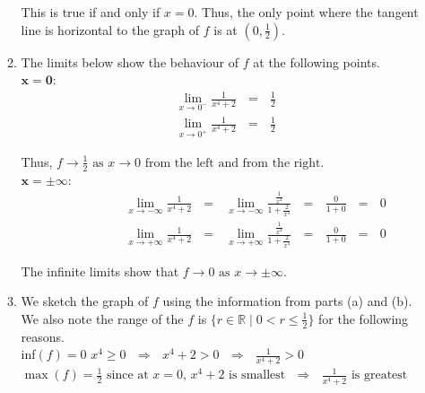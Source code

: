 \documentclass[12pt]{amsart}
\begin{document}
\begin{enumerate}
\begin{enumerate}
			\bigskip
			This is true if and only if $x=0$.  Thus, the only point where the tangent line is horizontal to the
			graph of $f$ is at $(0,\frac{1}{2})$. \\
			
			\item The limits below show the behaviour of $f$ at the following points. \\
			$\mathbf{x=0:}$
				\begin{eqnarray}
					\lim_{x \rightarrow 0^-} \frac{1}{x^4+2} \text{ } = \text{ } \frac{1}{2} \nonumber \\
					\lim_{x \rightarrow 0^+} \frac{1}{x^4+2} \text{ } = \text{ }  \frac{1}{2} \nonumber 
				\end{eqnarray}
			\medskip
				
			Thus, $f \rightarrow \frac{1}{2} \text{ as } x \rightarrow 0 \text{ from the left and from the right}$. 
			\\
			$\mathbf{x=\pm \infty:}$
				\begin{eqnarray}
					\hspace{2cm} \lim_{x \rightarrow -\infty} \frac{1}{x^4+2} \text{ } = \text{ } \lim_{x 							\rightarrow -\infty} \frac{\frac{1}{x^4}}{1+\frac{2}{x^4}} \text{ } = \text{ } \frac{0}{1+0} 						\text{ } = \text{ } 0 \nonumber \\
					\hspace{2cm} \lim_{x \rightarrow +\infty} \frac{1}{x^4+2} \text{ } = \text{ } \lim_{x 							\rightarrow +\infty} \frac{\frac{1}{x^4}}{1+\frac{2}{x^4}} \text{ } = \text{ } \frac{0}{1+0} 						\text{ } = \text{ } 0 \nonumber
				\end{eqnarray}
				
			\bigskip
			The infinite limits show that $f \rightarrow 0 \text{ as } x \rightarrow \pm \infty$.\\
			
			\item We sketch the graph of $f$ using the information from parts (a) and (b). We also note
			the range of the $f$ is $\{r \in \mathbb{R} \mid 0<r\le \frac{1}{2}\}$ for the following reasons. \\
						
			inf$(f)=0$  $x^4 \ge 0 \text{ } \Rightarrow \text{ } x^4+2 > 0\text{ } \Rightarrow \text{ } 			\frac{1}{x^4+2} > 0$ \\
			$\max(f)=\frac{1}{2} \text{ since at } x=0 \text{, }  x^4+2 \text{ is smallest} \text{ } \Rightarrow 
			\text{ } \frac{1}{x^4+2} \text{ is greatest}$
			

\end{enumerate}
\end{enumerate}
\end{document}
